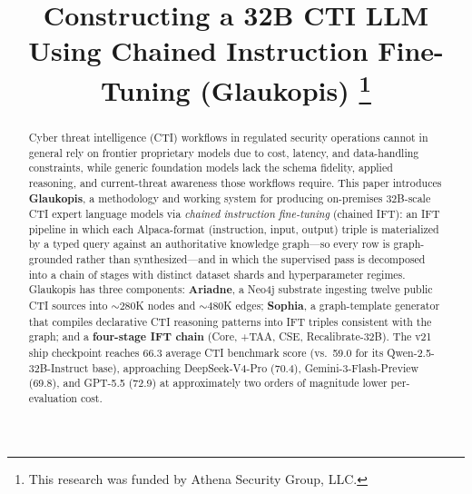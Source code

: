 \documentclass[conference]{IEEEtran}
\begin{document}
\title{Constructing a 32B CTI LLM Using Chained Instruction Fine-Tuning (Glaukopis)
\thanks{This research was funded by Athena Security Group, LLC.}
}

\author{%
%
}

\maketitle

\begin{abstract}
Cyber threat intelligence (CTI) workflows in regulated security operations cannot in general rely on frontier proprietary models due to cost, latency, and data-handling constraints, while generic foundation models lack the schema fidelity, applied reasoning, and current-threat awareness those workflows require. This paper introduces \textbf{Glaukopis}, a methodology and working system for producing on-premises 32B-scale CTI expert language models via \textit{chained instruction fine-tuning} (chained IFT): an IFT pipeline in which each Alpaca-format (instruction, input, output) triple is materialized by a typed query against an authoritative knowledge graph---so every row is graph-grounded rather than synthesized---and in which the supervised pass is decomposed into a chain of stages with distinct dataset shards and hyperparameter regimes. Glaukopis has three components: \textbf{Ariadne}, a Neo4j substrate ingesting twelve public CTI sources into ${\sim}280$K nodes and ${\sim}480$K edges; \textbf{Sophia}, a graph-template generator that compiles declarative CTI reasoning patterns into IFT triples consistent with the graph; and a \textbf{four-stage IFT chain} (Core, +TAA, CSE, Recalibrate-32B). The v21 ship checkpoint reaches 66.3 average CTI benchmark score (vs.\ 59.0 for its Qwen-2.5-32B-Instruct base), approaching DeepSeek-V4-Pro (70.4), Gemini-3-Flash-Preview (69.8), and GPT-5.5 (72.9) at approximately two orders of magnitude lower per-evaluation cost.
\end{abstract}
\end{document}
